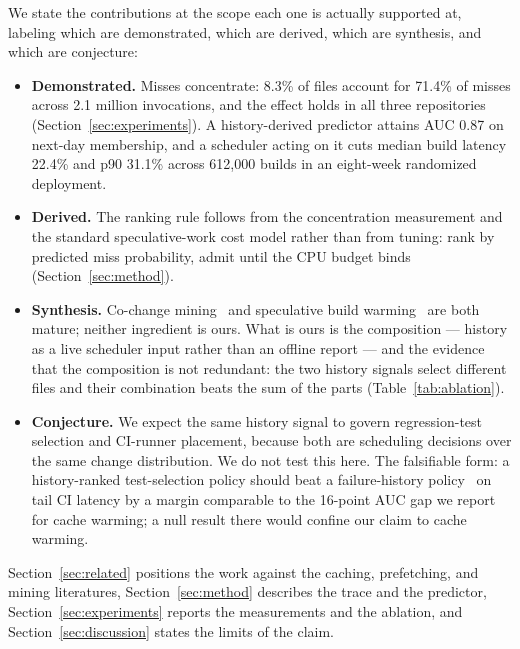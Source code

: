 \documentclass{anvil-paper}
\begin{document}
We state the contributions at the scope each one is actually supported at,
labeling which are demonstrated, which are derived, which are synthesis, and
which are conjecture:

\begin{itemize}
  \item \textbf{Demonstrated.} Misses concentrate: 8.3\% of files account for
        71.4\% of misses across 2.1 million invocations, and the effect holds
        in all three repositories (Section~\ref{sec:experiments}). A
        history-derived predictor attains AUC 0.87 on next-day membership, and
        a scheduler acting on it cuts median build latency 22.4\% and p90
        31.1\% across 612{,}000 builds in an eight-week randomized deployment.
  \item \textbf{Derived.} The ranking rule follows from the concentration
        measurement and the standard speculative-work cost model rather than
        from tuning: rank by predicted miss probability, admit until the CPU
        budget binds (Section~\ref{sec:method}).
  \item \textbf{Synthesis.} Co-change mining~\cite{ferreira2016cochange,
        imani2017graphcentrality} and speculative build
        warming~\cite{lindqvist2021prefetch, salcedo2023speculative} are both
        mature; neither ingredient is ours. What is ours is the composition —
        history as a live scheduler input rather than an offline report — and
        the evidence that the composition is not redundant: the two history
        signals select different files and their combination beats the sum of
        the parts (Table~\ref{tab:ablation}).
  \item \textbf{Conjecture.} We expect the same history signal to govern
        regression-test selection and CI-runner placement, because both are
        scheduling decisions over the same change distribution. We do not test
        this here. The falsifiable form: a history-ranked test-selection
        policy should beat a failure-history policy~\cite{bhattacharya2022testsel}
        on tail CI latency by a margin comparable to the 16-point AUC gap we
        report for cache warming; a null result there would confine our claim
        to cache warming.
\end{itemize}

Section~\ref{sec:related} positions the work against the caching, prefetching,
and mining literatures, Section~\ref{sec:method} describes the trace and the
predictor, Section~\ref{sec:experiments} reports the measurements and the
ablation, and Section~\ref{sec:discussion} states the limits of the claim.
\end{document}
